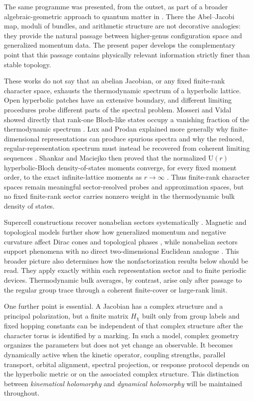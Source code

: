 \documentclass[11pt]{article}
\theoremstyle{definition}
\theoremstyle{remark}
\newcommand{\UU}{\mathrm U}
\begin{document}
The same programme was presented, from the outset, as part of a broader
algebraic-geometric approach to quantum matter in
\cite{RayanQuantumMatter2026}.  There the Abel--Jacobi map, moduli of bundles,
and arithmetic structure are not decorative analogies: they provide the
natural passage between higher-genus configuration space and generalized
momentum data.  The present paper develops the complementary point that this
passage contains physically relevant information strictly finer than stable
topology.

These works do not say that an abelian Jacobian, or any fixed finite-rank
character space, exhausts the thermodynamic spectrum of a hyperbolic lattice.
Open hyperbolic patches have an extensive boundary, and different limiting
procedures probe different parts of the spectral problem.  Mosseri and Vidal
showed directly that rank-one Bloch-like states occupy a vanishing fraction of
the thermodynamic spectrum \cite{MosseriVidal2023}.  Lux and Prodan explained
more generally why finite-dimensional representations can produce spurious
spectra and why the reduced, regular-representation spectrum must instead be
recovered from coherent limiting sequences
\cite{LuxProdanCayley2024,LuxProdan2023}.  Shankar and Maciejko then proved
that the normalized \(\UU(r)\) hyperbolic-Bloch density-of-states moments
converge, for every fixed moment order, to the exact infinite-lattice moments
as \(r\to\infty\) \cite{ShankarMaciejko2024}.  Thus finite-rank character
spaces remain meaningful sector-resolved probes and approximation spaces,
but no fixed finite-rank sector carries nonzero weight in the thermodynamic
bulk density of states.

Supercell constructions recover nonabelian sectors systematically
\cite{LenggenhagerEtAl2023}.  Magnetic and topological models further show how
generalized momentum and negative curvature affect Dirac cones and topological
phases \cite{IkedaAokiMatsuki,UrwylerEtAl2022}, while nonabelian sectors
support phenomena with no direct two-dimensional Euclidean analogue
\cite{TummuruEtAl2024}.  This broader picture also determines how the
nonfactorization results below should be read.  They apply exactly within each
representation sector and to finite periodic devices.  Thermodynamic bulk
averages, by contrast, arise only after passage to the regular group trace
through a coherent finite-cover or large-rank limit.

One further point is essential.  A Jacobian has a complex structure and a
principal polarization, but a finite matrix \(H_\chi\) built only from group
labels and fixed hopping constants can be independent of that complex
structure after the character torus is identified by a marking.  In such a
model, complex geometry organizes the parameters but does not yet change an
observable.  It becomes dynamically active when the kinetic operator,
coupling strengths, parallel transport, orbital alignment, spectral
projection, or response protocol depends on the hyperbolic metric or on the
associated complex structure.  This distinction between
\emph{kinematical holomorphy} and \emph{dynamical holomorphy} will be maintained
throughout.
\end{document}

